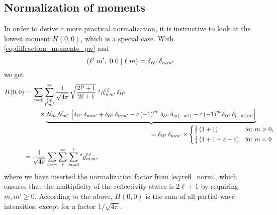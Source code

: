 \subsection{Normalization of moments}%
\label{sec:diffraction:moments_norm}

In order to derive a more practical normalization, it is instructive
to look at the lowest moment $H(0, 0)$, which is a special case.  With
\cref{eq:diffraction_moments_pw} and
\begin{equation}
  ({\ell'}\;{m'},\;{0}\;{0}\; |\; {\ell}\;{m})
  = \delta_{\ell \ell'}\, \delta_{m m'}
\end{equation}
we get
\begin{align}
  H(0, 0)
  ={}& \begin{multlined}[t]
    \sum_{\refl = \pm} \sum_{\substack{\ell m \\ \ell' m'}}^\infty
    \frac{1}{\sqrt{4 \pi}}\, \sqrt{\frac{2 \ell' + 1}{2 \ell + 1}}\,
      \prescript{\refl}{}{\varrho}^{\ell\, \ell'}_{m\, m'}\, \delta_{\ell \ell'} \\
      \times \rdUnderbrace{\mathcal{N}_m\, \mathcal{N}_{m'}\, \sBrk[2]{%
        \delta_{\ell \ell'}\, \delta_{m m'}
        + \delta_{\ell \ell'}\, \delta_{m m'}
        - \refl\, {(-1)}^{m'}\, \delta_{\ell \ell'}\, \delta_{m (-m')}
        - \refl\, {(-1)}^m\, \delta_{\ell \ell'}\, \delta_{(-m) m'}}}%
        {= \delta_{\ell \ell'}\, \delta_{m m'} \times
        \begin{cases*}
          \frac{1}{2}\, (1 + 1)                 & for $m > 0$, \\
          \frac{1}{4}\, (1 + 1 - \refl - \refl) & for $m = 0$
        \end{cases*}}
  \end{multlined} \notag
  \\
  \label{eq:diffraction_moment_00_pw}
  ={}& \frac{1}{\sqrt{4 \pi}} \sum_{\refl = \pm} \sum_\ell^\infty \sum_{m = 0}^\ell \prescript{\refl}{}{\varrho}^{\ell\, \ell}_{m\, m},
\end{align}
where we have inserted the normalization factor from
\cref{eq:refl_norm}, which ensures that the multiplicity of the
reflectivity states is $2 \ell + 1$ by requiring $m, m' \geq 0$.
According to the above, $H(0, 0)$ is the sum of all partial-wave
intensities, except for a factor $1 / \sqrt{4 \pi}$.

